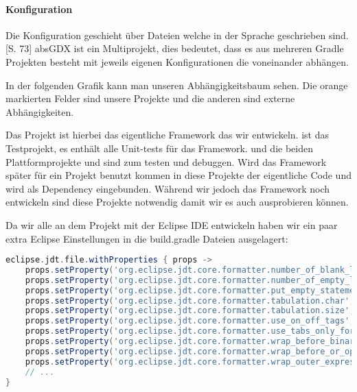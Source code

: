 \paragraph{Konfiguration}

Die Konfiguration geschieht über  Dateien welche in der Sprache  geschrieben sind.\cite{GRADLE}[S. 73]
absGDX ist ein Multiprojekt, dies bedeutet, dass es  aus mehreren Gradle Projekten besteht mit jeweils eigenen Konfigurationen die voneinander abhängen. \cite[S. 79ff]{BATWG}

In der folgenden Grafik kann man unseren Abhängigkeitsbaum sehen. Die orange markierten Felder sind unsere Projekte und die anderen sind externe Abhängigkeiten.


Das Projekt  ist hierbei das eigentliche Framework das wir entwickeln.  ist das Testprojekt, es enthält alle Unit-tests für das Framework.
 und die beiden Plattformprojekte  und  sind zum testen und debuggen. Wird das Framework später für ein Projekt benutzt kommen in diese Projekte der eigentliche Code und  wird als Dependency eingebunden. Während wir jedoch das Framework noch entwickeln sind diese Projekte notwendig damit wir es auch ausprobieren können.

Da wir alle an dem Projekt mit der Eclipse IDE entwickeln haben wir ein paar extra Eclipse Einstellungen in die build.gradle Dateien ausgelagert:

\doinline
\begin{lstlisting}[caption=Eclipse Optionen in gradle setzen, title=\hspace{0 pt}, language=groovy]
eclipse.jdt.file.withProperties { props ->
    props.setProperty('org.eclipse.jdt.core.formatter.number_of_blank_lines_at_beginning_of_method_body', '0')
    props.setProperty('org.eclipse.jdt.core.formatter.number_of_empty_lines_to_preserve', '1')
    props.setProperty('org.eclipse.jdt.core.formatter.put_empty_statement_on_new_line', 'true')
    props.setProperty('org.eclipse.jdt.core.formatter.tabulation.char', 'tab')
    props.setProperty('org.eclipse.jdt.core.formatter.tabulation.size', '4')
    props.setProperty('org.eclipse.jdt.core.formatter.use_on_off_tags', 'false')
    props.setProperty('org.eclipse.jdt.core.formatter.use_tabs_only_for_leading_indentations', 'false')
    props.setProperty('org.eclipse.jdt.core.formatter.wrap_before_binary_operator', 'true')
    props.setProperty('org.eclipse.jdt.core.formatter.wrap_before_or_operator_multicatch', 'true')
    props.setProperty('org.eclipse.jdt.core.formatter.wrap_outer_expressions_when_nested', 'true')
    // ...
}
\end{lstlisting}

